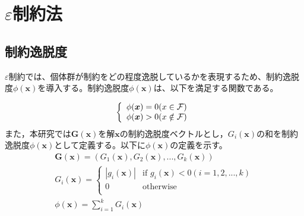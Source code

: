 \documentclass[a4paper,12pt]{jsreport}
\begin{document}


\newpage


\section{$\varepsilon$制約法}
\subsection{制約逸脱度}
$\varepsilon$制約では、個体群が制約をどの程度逸脱しているかを表現するため、制約逸脱度$\phi(\bm x)$を導入する。制約逸脱度$\phi(\bm x)$は、以下を満足する関数である。

\begin{eqnarray}
\left\{
\begin{array}{cc}
    \phi(\bm x)=0(x\in{\cal{F}})\\
    \phi(\bm x)>0(x\notin{\cal{F}})\\
\end{array}
\right.
\end{eqnarray}
また，本研究では$\bm{G}(\bm{x})$を解$\bm x$の制約逸脱度ベクトルとし，${G}_i(\bm{x})$の和を制約逸脱度$\phi(\bm x)$として定義する。以下に$\phi(\bm x)$の定義を示す。
\begin{eqnarray}
\bm{G(x)}=({G}_1(\bm{x}),{G}_2(\bm{x}),...,{G}_k(\bm{x}))\\   
{G}_i(\bm{x})=
\left\{
\begin{array}{cc}
     |{g}_i(\bm{x})| & \mbox{if  ${g}_i(\bm{x})<0 (i=1,2,...,k)$} \\
    {0} & \mbox{otherwise}\\
\end{array}
\right.\\
{\phi(\bm{x})}=\sum_{i=1}^k {G}_i(\bm{x})
\end{eqnarray}
\end{document}
